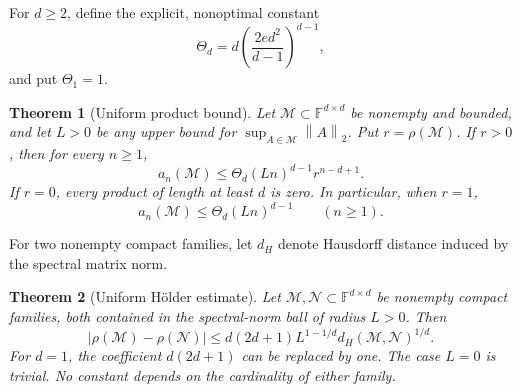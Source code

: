 \documentclass[11pt]{article}
\newtheorem{theorem}{Theorem}
\theoremstyle{remark}\newtheorem{remark}[theorem]{Remark}
\newcommand{\F}{\mathbb F}
\newcommand{\norm}[1]{\left\lVert #1\right\rVert_2}
\begin{document}
For $d\geq2$, define the explicit, nonoptimal constant
\[
 \Theta_d=d\left(\frac{2ed^2}{d-1}\right)^{d-1},
\]
and put $\Theta_1=1$.

\begin{theorem}[Uniform product bound]\label{thm:growth}
Let $\mathcal M\subset\F^{d\times d}$ be nonempty and bounded, and let $L>0$ be any upper bound for $\sup_{A\in\mathcal M}\norm A$. Put $r=\rho(\mathcal M)$.
If $r>0$, then for every $n\geq1$,
\begin{equation}\label{eq:general-growth}
 a_n(\mathcal M)\leq\Theta_d(Ln)^{d-1}r^{n-d+1}.
\end{equation}
If $r=0$, every product of length at least $d$ is zero.
In particular, when $r=1$,
\begin{equation}\label{eq:radius-one-growth}
 a_n(\mathcal M)\leq\Theta_d(Ln)^{d-1}\qquad(n\geq1).
\end{equation}
\end{theorem}

For two nonempty compact families, let $d_H$ denote Hausdorff distance induced by the spectral matrix norm.
\begin{theorem}[Uniform H\"older estimate]\label{thm:holder}
Let $\mathcal M,\mathcal N\subset\F^{d\times d}$ be nonempty compact families, both contained in the spectral-norm ball of radius $L>0$. Then
\begin{equation}\label{eq:holder}
 |\rho(\mathcal M)-\rho(\mathcal N)|
 \leq d(2d+1)L^{1-1/d}d_H(\mathcal M,\mathcal N)^{1/d}.
\end{equation}
For $d=1$, the coefficient $d(2d+1)$ can be replaced by one. The case $L=0$ is trivial. No constant depends on the cardinality of either family.
\end{theorem}
\end{document}
